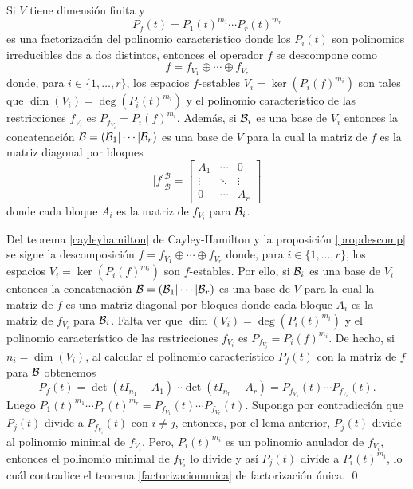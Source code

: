 \begin{teo}
  Si $V$ tiene dimensión finita y $$P_f(t)=P_1(t)^{m_1}\cdots P_r(t)^{m_r}$$ es una factorización del polinomio característico donde los $P_i(t)$ son polinomios irreducibles dos a dos distintos, entonces el operador $f$ se descompone como $$f=f_{V_1}\oplus\cdots\oplus f_{V_r}$$ donde, para $i\in\{1,\ldots,r\}$, los espacios $f$-estables $V_i=\ker\left(P_i(f)^{m_i}\right)$ son tales que $\dim(V_i)=\deg\left(P_i(t)^{m_i}\right)$ y el polinomio característico de las restricciones $f_{V_i}$ es $P_{f_{V_i}}=P_i(f)^{m_i}$. Además, si $\mathcal{B}_i$ es una base de $V_i$ entonces la concatenación $\mathcal{B}=(\mathcal{B}_1|\cdots|\mathcal{B}_r)$ es una base de $V$ para la cual la matriz de $f$ es la matriz diagonal por bloques
  \[
    \Big[f\Big]^\mathcal{B}_\mathcal{B}=\left[\begin{array}{c|c|c}
      A_1 & \cdots & 0\\
      \hline
      \vdots & \ddots & \vdots\\
      \hline
      0 & \cdots & A_r
      \end{array}\right] 
  \]
  donde cada bloque $A_i$ es la matriz de $f_{V_i}$ para $\mathcal{B}_i$. 
\end{teo}

\dem Del teorema \ref{cayleyhamilton} de Cayley-Hamilton y la proposición \ref{propdescomp} se sigue la descomposición $f=f_{V_1}\oplus\cdots\oplus f_{V_r}$ donde, para $i\in\{1,\ldots,r\}$, los espacios $V_i=\ker\left(P_i(f)^{m_i}\right)$ son $f$-estables. Por ello, si $\mathcal{B}_i$ es una base de $V_i$ entonces la concatenación $\mathcal{B}=(\mathcal{B}_1|\cdots|\mathcal{B}_r)$ es una base de $V$ para la cual la matriz de $f$ es una matriz diagonal por bloques donde cada bloque $A_i$ es la matriz de $f_{V_i}$ para $\mathcal{B}_i$. Falta ver que $\dim(V_i)=\deg\left(P_i(t)^{m_i}\right)$ y el polinomio característico de las restricciones $f_{V_i}$ es $P_{f_{V_i}}=P_i(f)^{m_i}$. De hecho, si $n_i=\dim(V_i)$, al calcular el polinomio característico $P_f(t)$ con la matriz de $f$ para $\mathcal{B}$ obtenemos
$$P_f(t)=\det(tI_{n_1}-A_1)\cdots\det(tI_{n_r}-A_r)=P_{f_{V_1}}(t)\cdots P_{f_{V_r}}(t).$$
Luego $P_1(t)^{m_1}\cdots P_r(t)^{m_r}=P_{f_{V_1}}(t)\cdots P_{f_{V_r}}(t)$. Suponga por contradicción que $P_j(t)$ divide a $P_{f_{V_i}}(t)$ con $i\ne j$, entonces, por el lema anterior, $P_j(t)$ divide al polinomio minimal de $f_{V_i}$. Pero, $P_i(t)^{m_i}$ es un polinomio anulador de $f_{V_i}$, entonces el polinomio minimal de $f_{V_i}$ lo divide y así $P_j(t)$ divide a $P_i(t)^{m_i}$, lo cuál contradice el teorema \ref{factorizacionunica} de factorización única. 
\qed 

